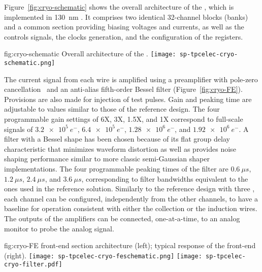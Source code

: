 Figure~\ref{fig:cryo-schematic} shows the overall architecture of the 
 , which is implemented in \SI{130}{nm} . 
It comprises two identical 32-channel blocks (banks) and a common section
providing biasing voltages and currents, as well as the controls signals, the clocks 
generation, and the configuration of the registers.

\begin{dunefigure}
{fig:cryo-schematic}
{Overall architecture of the  .}
\texttt{[image: sp-tpcelec-cryo-schematic.png]}
\end{dunefigure}

The current signal from each wire is amplified using a preamplifier with pole-zero
cancellation~\cite{DeGeronimo:2011zz} and an anti-alias fifth-order 
Bessel filter (Figure~\ref{fig:cryo-FE}). Provisions are also made for injection 
of test pulses. Gain and peaking time are adjustable to values similar to 
those of the reference design. 
The four programmable gain settings of 6X, 3X, 1.5X, and 1X correspond to full-scale signals of 
$\SI{3.2e5}{e^{-}}$, $\SI{6.4e5}{e^{-}}$, $\SI{1.28e6}{e^{-}}$, and $\SI{1.92e6}{e^{-}}$. A 
filter with a Bessel shape has been chosen because of its flat group delay characteristic 
that minimizes waveform distortion as well as provides noise shaping performance similar 
to more classic semi-Gaussian shaper implementations. The four programmable peaking times 
of the filter are $\SI{0.6}{{\mu}s}$, $\SI{1.2}{{\mu}s}$, $\SI{2.4}{{\mu}s}$, 
and $\SI{3.6}{{\mu}s}$, corresponding to filter bandwidths equivalent to the ones used in 
the reference solution. Similarly to the reference design with three , each
channel can be configured, independently from the other channels, to have a 
baseline for operation consistent with either the collection or the induction wires. 
The outputs of the  amplifiers can be connected, one-at-a-time, 
to an analog monitor to probe the analog signal.

\begin{dunefigure}
{fig:cryo-FE}
{ front-end section architecture (left); typical response of the  front-end (right).}
\texttt{[image: sp-tpcelec-cryo-feschematic.png]}
\texttt{[image: sp-tpcelec-cryo-filter.pdf]}
\end{dunefigure}

